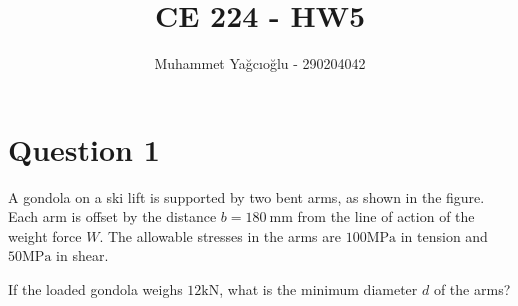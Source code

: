 \documentclass[12pt]{article}
\title{\vspace{-1cm}CE 224 - HW5}
\author{Muhammet Yağcıoğlu - 290204042}
\begin{document}
\maketitle\thispagestyle{fancy}
\pagestyle{fancy}
\tableofcontents
\newpage



\section*{Question 1}
\begin{q}
A gondola on a ski lift is supported by two bent arms, as shown in the figure. Each arm is offset by the distance \(b=180 \mathrm{~mm}\) from the line of action of the weight force \(W\). The allowable stresses in the arms are \(100 \mathrm{MPa}\) in tension and \(50 \mathrm{MPa}\) in shear.

If the loaded gondola weighs \(12 \mathrm{kN}\), what is the minimum diameter \(d\) of the arms?
\end{q}

\begin{figure}[!ht]
    \centering
    \caption{}
    \label{fig:enter-label}
\end{figure}
\end{document}
